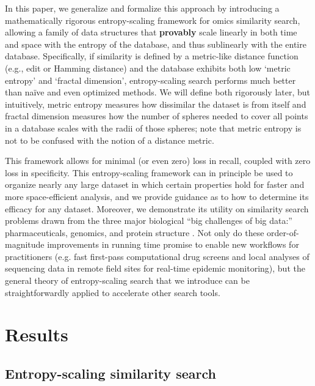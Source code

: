 \documentclass[review,preprint,12pt]{elsarticle}
\renewcommand{\cite}{\citep} %
\theoremstyle{definition}
\theoremstyle{remark}
\numberwithin{equation}{section}
\begin{document}
In this paper, we generalize and formalize this approach by introducing 
a mathematically rigorous entropy-scaling framework for 
omics similarity search, allowing a family of data structures that \textbf{provably} scale linearly in both time and space with the entropy of the database, and thus sublinearly with the entire database.
Specifically, if similarity is defined by a metric-like distance function (e.g., edit or Hamming distance) and the database exhibits both low `metric entropy' and `fractal dimension', entropy-scaling search performs much better than na\"ive and even optimized methods.
We will define both rigorously later, but intuitively, metric entropy measures how dissimilar the dataset is from itself and fractal dimension measures how the number of spheres needed to cover all points in a database scales with the radii of those spheres; note that metric entropy is not to be confused with the notion of a distance metric.

This framework allows for minimal (or even zero) loss in recall, coupled
with zero loss in specificity.
This entropy-scaling framework can in principle be used to organize nearly any large dataset in which certain properties hold for faster and more space-efficient analysis,
and we provide guidance as to how to determine its efficacy for any dataset.
Moreover, we demonstrate its utility on similarity search problems drawn from the three major biological ``big challenges of big data:'' pharmaceuticals, genomics, and protein structure \cite{marx2013biology}.
Not only do these order-of-magnitude improvements in running time promise to enable new workflows for practitioners (e.g. fast first-pass computational drug screens and local analyses of sequencing data in remote field sites for real-time epidemic monitoring), but the general theory of entropy-scaling search that we introduce can be straightforwardly applied to accelerate other search tools.

\section{Results}

\subsection{Entropy-scaling similarity search}
\end{document}
